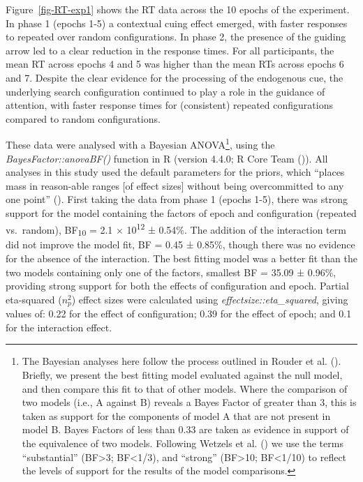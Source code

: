 \documentclass[
  man,
  floatsintext,
  longtable,
  nolmodern,
  notxfonts,
  notimes,
  colorlinks=true,linkcolor=blue,citecolor=blue,urlcolor=blue]{apa7}
\begin{document}
Figure~\ref{fig-RT-exp1} shows the RT data across the 10 epochs of the
experiment. In phase 1 (epochs 1-5) a contextual cuing effect emerged,
with faster responses to repeated over random configurations. In phase
2, the presence of the guiding arrow led to a clear reduction in the
response times. For all participants, the mean RT across epochs 4 and 5
was higher than the mean RTs across epochs 6 and 7. Despite the clear
evidence for the processing of the endogenous cue, the underlying search
configuration continued to play a role in the guidance of attention,
with faster response times for (consistent) repeated configurations
compared to random configurations.

These data were analysed with a Bayesian ANOVA\footnote{The Bayesian
  analyses here follow the process outlined in Rouder et al.
  (). Briefly, we present the best
  fitting model evaluated against the null model, and then compare this
  fit to that of other models. Where the comparison of two models (i.e.,
  A against B) reveals a Bayes Factor of greater than 3, this is taken
  as support for the components of model A that are not present in model
  B. Bayes Factors of less than 0.33 are taken as evidence in support of
  the equivalence of two models. Following Wetzels et al.
  () we use the terms ``substantial''
  (BF\textgreater3; BF\textless1/3), and ``strong'' (BF\textgreater10;
  BF\textless1/10) to reflect the levels of support for the results of
  the model comparisons.}, using the \emph{BayesFactor::anovaBF()}
function in R (version 4.4.0; R Core Team
()). All analyses in this study used the
default parameters for the priors, which ``places mass in reason-able
ranges {[}of effect sizes{]} without being overcommitted to any one
point'' (). First
taking the data from phase 1 (epochs 1-5), there was strong support for
the model containing the factors of epoch and configuration (repeated
vs.~random), BF\textsubscript{10} = 2.1 × 10\textsuperscript{12} ±
0.54\%. The addition of the interaction term did not improve the model
fit, BF = 0.45 ± 0.85\%, though there was no evidence for the absence of
the interaction. The best fitting model was a better fit than the two
models containing only one of the factors, smallest BF = 35.09 ± 0.96\%,
providing strong support for both the effects of configuration and
epoch. Partial eta-squared (\(n^2_p\)) effect sizes were calculated
using \emph{effectsize::eta\_squared}, giving values of: 0.22 for the
effect of configuration; 0.39 for the effect of epoch; and 0.1 for the
interaction effect.
\end{document}
